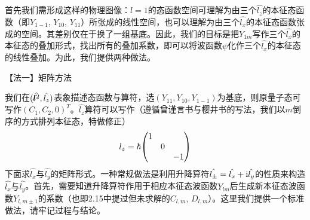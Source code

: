 \begin{enumerate}[label=2.\arabic*, leftmargin=-0.5mm]
首先我们需形成这样的物理图像：$l=1$的态函数空间可理解为由三个$\hat{l_z}$的本征态函数（即$Y_{1-1}$, $Y_{10}$, $Y_{11}$）所张成的线性空间，也可以理解为由三个$\hat{l_x}$的本征态函数张成的空间。其差别仅在于换了一组基底。因此，我们的目标是把$Y_{1m}$写作三个$\hat{l_x}$的本征态的叠加形式，找出所有的叠加系数，即可以将波函数$\psi$化作三个$\hat{l_x}$的本征态的线性叠加。为此，我们提供两种做法。

【法一】矩阵方法

我们在$(\hat{\boldsymbol{l}^2},\hat{l_z})$表象描述态函数与算符，选$(Y_{11},Y_{10},Y_{1-1})$为基底，则原量子态可写作$(C_1,C_2,0)^T$。$\hat{l_z}$算符可以写作（遵循曾谨言书与樱井书的写法，我们以$m$倒序的方式排列本征态，特做修正）
\[l_z = \hbar\mqty(\dmat{1,0,-1})\]
下面求$\hat{l_x}$与$\hat{l_y}$的矩阵形式。{\color{red}一种常规做法是利用升降算符$\hat{l_\pm}=\hat{l_x}+\mathrm{i}\hat{l_y}$的性质来构造$\hat{l_x}$与$\hat{l_y}$}。首先，需要知道升降算符作用于相应本征态波函数$Y_{lm}$后生成新本征态波函数$Y_{l,m\pm1}$的系数（也即2.15中提过但未求解的$C_{l,m}$, $D_{l,m}$）。{\color{red}这里我们提供一个标准做法，请牢记过程与结论。}


\end{enumerate}
